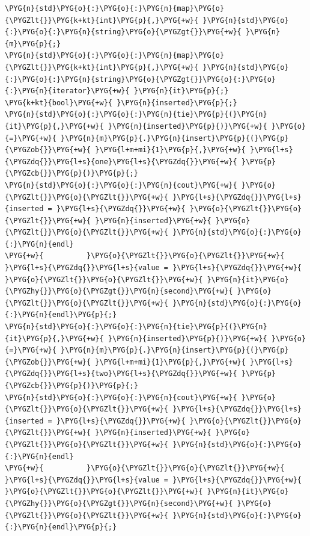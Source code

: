 \begin{codeblockbg}
\begin{Verbatim}[commandchars=\\\{\},breaklines=true,breakanywhere=true,fontsize=\codefont,xleftmargin=17bp]
\PYG{n}{std}\PYG{o}{:}\PYG{o}{:}\PYG{n}{map}\PYG{o}{\PYGZlt{}}\PYG{k+kt}{int}\PYG{p}{,}\PYG{+w}{ }\PYG{n}{std}\PYG{o}{:}\PYG{o}{:}\PYG{n}{string}\PYG{o}{\PYGZgt{}}\PYG{+w}{ }\PYG{n}{m}\PYG{p}{;}
\PYG{n}{std}\PYG{o}{:}\PYG{o}{:}\PYG{n}{map}\PYG{o}{\PYGZlt{}}\PYG{k+kt}{int}\PYG{p}{,}\PYG{+w}{ }\PYG{n}{std}\PYG{o}{:}\PYG{o}{:}\PYG{n}{string}\PYG{o}{\PYGZgt{}}\PYG{o}{:}\PYG{o}{:}\PYG{n}{iterator}\PYG{+w}{ }\PYG{n}{it}\PYG{p}{;}
\PYG{k+kt}{bool}\PYG{+w}{ }\PYG{n}{inserted}\PYG{p}{;}
\PYG{n}{std}\PYG{o}{:}\PYG{o}{:}\PYG{n}{tie}\PYG{p}{(}\PYG{n}{it}\PYG{p}{,}\PYG{+w}{ }\PYG{n}{inserted}\PYG{p}{)}\PYG{+w}{ }\PYG{o}{=}\PYG{+w}{ }\PYG{n}{m}\PYG{p}{.}\PYG{n}{insert}\PYG{p}{(}\PYG{p}{\PYGZob{}}\PYG{+w}{ }\PYG{l+m+mi}{1}\PYG{p}{,}\PYG{+w}{ }\PYG{l+s}{\PYGZdq{}}\PYG{l+s}{one}\PYG{l+s}{\PYGZdq{}}\PYG{+w}{ }\PYG{p}{\PYGZcb{}}\PYG{p}{)}\PYG{p}{;}
\PYG{n}{std}\PYG{o}{:}\PYG{o}{:}\PYG{n}{cout}\PYG{+w}{ }\PYG{o}{\PYGZlt{}}\PYG{o}{\PYGZlt{}}\PYG{+w}{ }\PYG{l+s}{\PYGZdq{}}\PYG{l+s}{inserted = }\PYG{l+s}{\PYGZdq{}}\PYG{+w}{ }\PYG{o}{\PYGZlt{}}\PYG{o}{\PYGZlt{}}\PYG{+w}{ }\PYG{n}{inserted}\PYG{+w}{ }\PYG{o}{\PYGZlt{}}\PYG{o}{\PYGZlt{}}\PYG{+w}{ }\PYG{n}{std}\PYG{o}{:}\PYG{o}{:}\PYG{n}{endl}
\PYG{+w}{          }\PYG{o}{\PYGZlt{}}\PYG{o}{\PYGZlt{}}\PYG{+w}{ }\PYG{l+s}{\PYGZdq{}}\PYG{l+s}{value = }\PYG{l+s}{\PYGZdq{}}\PYG{+w}{ }\PYG{o}{\PYGZlt{}}\PYG{o}{\PYGZlt{}}\PYG{+w}{ }\PYG{n}{it}\PYG{o}{\PYGZhy{}}\PYG{o}{\PYGZgt{}}\PYG{n}{second}\PYG{+w}{ }\PYG{o}{\PYGZlt{}}\PYG{o}{\PYGZlt{}}\PYG{+w}{ }\PYG{n}{std}\PYG{o}{:}\PYG{o}{:}\PYG{n}{endl}\PYG{p}{;}
\PYG{n}{std}\PYG{o}{:}\PYG{o}{:}\PYG{n}{tie}\PYG{p}{(}\PYG{n}{it}\PYG{p}{,}\PYG{+w}{ }\PYG{n}{inserted}\PYG{p}{)}\PYG{+w}{ }\PYG{o}{=}\PYG{+w}{ }\PYG{n}{m}\PYG{p}{.}\PYG{n}{insert}\PYG{p}{(}\PYG{p}{\PYGZob{}}\PYG{+w}{ }\PYG{l+m+mi}{1}\PYG{p}{,}\PYG{+w}{ }\PYG{l+s}{\PYGZdq{}}\PYG{l+s}{two}\PYG{l+s}{\PYGZdq{}}\PYG{+w}{ }\PYG{p}{\PYGZcb{}}\PYG{p}{)}\PYG{p}{;}
\PYG{n}{std}\PYG{o}{:}\PYG{o}{:}\PYG{n}{cout}\PYG{+w}{ }\PYG{o}{\PYGZlt{}}\PYG{o}{\PYGZlt{}}\PYG{+w}{ }\PYG{l+s}{\PYGZdq{}}\PYG{l+s}{inserted = }\PYG{l+s}{\PYGZdq{}}\PYG{+w}{ }\PYG{o}{\PYGZlt{}}\PYG{o}{\PYGZlt{}}\PYG{+w}{ }\PYG{n}{inserted}\PYG{+w}{ }\PYG{o}{\PYGZlt{}}\PYG{o}{\PYGZlt{}}\PYG{+w}{ }\PYG{n}{std}\PYG{o}{:}\PYG{o}{:}\PYG{n}{endl}
\PYG{+w}{          }\PYG{o}{\PYGZlt{}}\PYG{o}{\PYGZlt{}}\PYG{+w}{ }\PYG{l+s}{\PYGZdq{}}\PYG{l+s}{value = }\PYG{l+s}{\PYGZdq{}}\PYG{+w}{ }\PYG{o}{\PYGZlt{}}\PYG{o}{\PYGZlt{}}\PYG{+w}{ }\PYG{n}{it}\PYG{o}{\PYGZhy{}}\PYG{o}{\PYGZgt{}}\PYG{n}{second}\PYG{+w}{ }\PYG{o}{\PYGZlt{}}\PYG{o}{\PYGZlt{}}\PYG{+w}{ }\PYG{n}{std}\PYG{o}{:}\PYG{o}{:}\PYG{n}{endl}\PYG{p}{;}
\end{Verbatim}
\end{codeblockbg}


